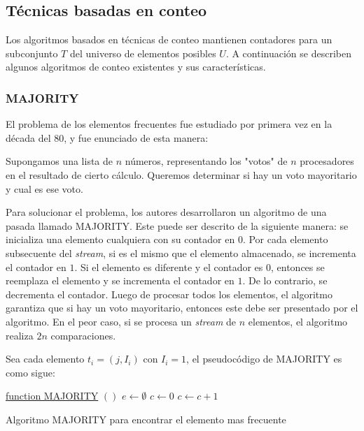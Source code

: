 \documentclass[a4paper,10pt, oneside]{article}
\begin{document}
\subsection{Técnicas basadas en conteo}\label{tecnicas_conteo}

Los algoritmos basados en técnicas de conteo mantienen contadores para un subconjunto $T$ del universo de elementos posibles $U$. A continuación se describen algunos algoritmos de conteo existentes y sus características.

\subsubsection{MAJORITY}
El problema de los elementos frecuentes fue estudiado por primera vez en la década del 80, y fue enunciado de esta manera:
\begin{displayquote}
	Supongamos una lista de $n$ números, representando los "votos" de $n$ procesadores en el resultado de cierto cálculo. Queremos determinar si hay un voto mayoritario y cual es ese voto.\cite{GUIBAS1981208}
\end{displayquote}

Para solucionar el problema, los autores desarrollaron un algoritmo de una pasada llamado MAJORITY. Este puede ser descrito de la siguiente manera: se inicializa una elemento cualquiera con su contador en $0$. Por cada elemento subsecuente del \textit{stream}, si es el mismo que el elemento almacenado, se incrementa el contador en $1$. Si el elemento es diferente y el contador es $0$, entonces se reemplaza el elemento y se incrementa el contador en $1$. De lo contrario, se decrementa el contador. Luego de procesar todos los elementos, el algoritmo garantiza que si hay un voto mayoritario, entonces este debe ser presentado por el algoritmo. En el peor caso, si se procesa un \textit{stream} de $n$ elementos, el algoritmo realiza $2n$ comparaciones.

Sea cada elemento $t_i = (j, I_i)$ con $I_i = 1$, el pseudocódigo de MAJORITY es como sigue:

\begin{algorithm}
	
	\underline{function MAJORITY} $()$\;
	$e \leftarrow \emptyset$\; $c \leftarrow 0$\;
	{
		{
			$c \leftarrow c + 1$\;
		}{
		}
	}
	\caption{Algoritmo MAJORITY para encontrar el elemento mas frecuente}
	\label{alg:majority}
\end{algorithm}
\end{document}
